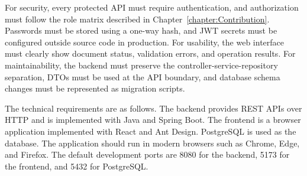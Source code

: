 For security, every protected API must require authentication, and authorization
must follow the role matrix described in Chapter~\ref{chapter:Contribution}.
Passwords must be stored using a one-way hash, and JWT secrets must be
configured outside source code in production. For usability, the web interface
must clearly show document status, validation errors, and operation results.
For maintainability, the backend must preserve the controller-service-repository
separation, DTOs must be used at the API boundary, and database schema changes
must be represented as migration scripts.

The technical requirements are as follows. The backend provides REST APIs over
HTTP and is implemented with Java and Spring Boot. The frontend is a browser
application implemented with React and Ant Design. PostgreSQL is used as the
database. The application should run in modern browsers such as Chrome, Edge,
and Firefox. The default development ports are 8080 for the backend, 5173 for
the frontend, and 5432 for PostgreSQL.
